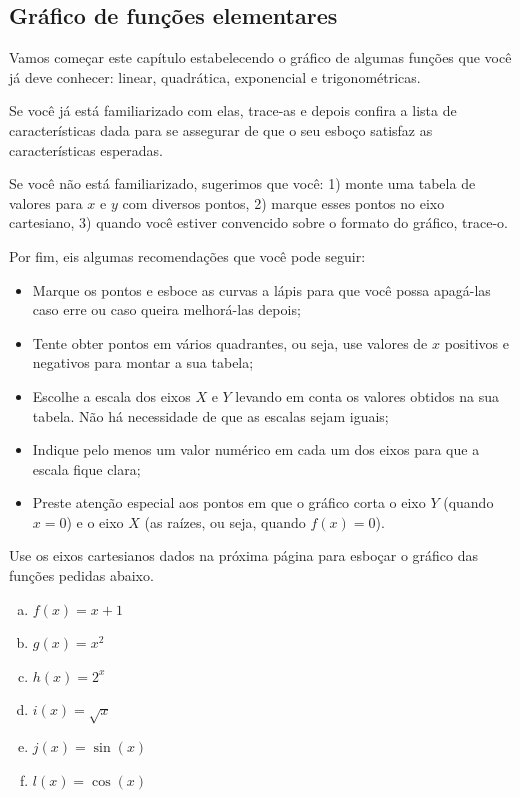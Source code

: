 \documentclass[main.tex]{subfiles}
\begin{document}
\subsection*{Gráfico de funções elementares}

Vamos começar este capítulo estabelecendo o gráfico de algumas funções que você já deve conhecer: linear, quadrática, exponencial e trigonométricas.

Se você já está familiarizado com elas, trace-as e depois confira a lista de características dada para se assegurar de que o seu esboço satisfaz as características esperadas.

Se você não está familiarizado, sugerimos que você: 1) monte uma tabela de valores para $x$ e $y$ com diversos pontos, 2) marque esses pontos no eixo cartesiano, 3) quando você estiver convencido sobre o formato do gráfico, trace-o.

Por fim, eis algumas recomendações que você pode seguir:

\begin{itemize}
 \item Marque os pontos e esboce as curvas a lápis para que você possa apagá-las caso erre ou caso queira melhorá-las depois;
 \item Tente obter pontos em vários quadrantes, ou seja, use valores de $x$ positivos e negativos para montar a sua tabela;
 \item Escolhe a escala dos eixos $X$ e $Y$ levando em conta os valores obtidos na sua tabela. Não há necessidade de que as escalas sejam iguais;
 \item Indique pelo menos um valor numérico em cada um dos eixos para que a escala fique clara;
 \item Preste atenção especial aos pontos em que o gráfico corta o eixo $Y$ (quando $x=0$) e o eixo $X$ (as raízes, ou seja, quando $f(x)=0$).
\end{itemize}

\newpage

\begin{questao}
Use os eixos cartesianos dados na próxima página para esboçar o gráfico das funções pedidas abaixo.
\begin{enumerate}[a)]
\item $f(x)=x+1$
\item $g(x)=x^2$
\item $h(x)=2^x$
\item $i(x)=\sqrt{x}$
\item $j(x)=\sin(x)$
\item $l(x)=\cos(x)$
\end{enumerate}
\end{questao}
\end{document}
